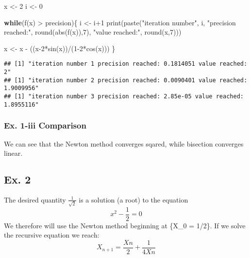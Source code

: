 \documentclass[
]{article}
\newenvironment{Shaded}{\begin{snugshade}}{\end{snugshade}}
\newcommand{\ControlFlowTok}[1]{\textcolor[rgb]{0.13,0.29,0.53}{\textbf{#1}}}
\newcommand{\DecValTok}[1]{\textcolor[rgb]{0.00,0.00,0.81}{#1}}
\newcommand{\FunctionTok}[1]{\textcolor[rgb]{0.00,0.00,0.00}{#1}}
\newcommand{\NormalTok}[1]{#1}
\newcommand{\OtherTok}[1]{\textcolor[rgb]{0.56,0.35,0.01}{#1}}
\newcommand{\SpecialCharTok}[1]{\textcolor[rgb]{0.00,0.00,0.00}{#1}}
\newcommand{\StringTok}[1]{\textcolor[rgb]{0.31,0.60,0.02}{#1}}
\begin{document}
\begin{Shaded}
\begin{Highlighting}[]
\NormalTok{x }\OtherTok{\textless{}{-}} \DecValTok{2}
\NormalTok{i }\OtherTok{\textless{}{-}} \DecValTok{0}

\ControlFlowTok{while}\NormalTok{(}\FunctionTok{f}\NormalTok{(x) }\SpecialCharTok{\textgreater{}}\NormalTok{ precision)\{}
\NormalTok{  i }\OtherTok{\textless{}{-}}\NormalTok{ i}\SpecialCharTok{+}\DecValTok{1}
  \FunctionTok{print}\NormalTok{(}\FunctionTok{paste}\NormalTok{(}\StringTok{"iteration number"}\NormalTok{, i, }\StringTok{"precision reached:"}\NormalTok{, }\FunctionTok{round}\NormalTok{(}\FunctionTok{abs}\NormalTok{(}\FunctionTok{f}\NormalTok{(x)),}\DecValTok{7}\NormalTok{), }\StringTok{"value reached:"}\NormalTok{, }\FunctionTok{round}\NormalTok{(x,}\DecValTok{7}\NormalTok{)))}


\NormalTok{  x }\OtherTok{\textless{}{-}}\NormalTok{ x }\SpecialCharTok{{-}}\NormalTok{ ((x}\DecValTok{{-}2}\SpecialCharTok{*}\FunctionTok{sin}\NormalTok{(x))}\SpecialCharTok{/}\NormalTok{(}\DecValTok{1{-}2}\SpecialCharTok{*}\FunctionTok{cos}\NormalTok{(x)))}
\NormalTok{\}}
\end{Highlighting}
\end{Shaded}

\begin{verbatim}
## [1] "iteration number 1 precision reached: 0.1814051 value reached: 2"
## [1] "iteration number 2 precision reached: 0.0090401 value reached: 1.9009956"
## [1] "iteration number 3 precision reached: 2.85e-05 value reached: 1.8955116"
\end{verbatim}

\hypertarget{ex.-1-iii-comparison}{%
\subsubsection{Ex. 1-iii Comparison}\label{ex.-1-iii-comparison}}

We can see that the Newton method converges sqared, while bisection
converges linear.

\hypertarget{ex.-2}{%
\subsection{Ex. 2}\label{ex.-2}}

The desired quantity \(\frac{1}{\sqrt2}\) is a solution (a root) to the
equation \[
    x^2 - \frac{1}{2} = 0
\] We therefore will use the Newton method beginning at \{X\_0 = 1/2\}.
If we solve the recursive equation we reach: \[
X_{n+1} = \frac{Xn}{2} + \frac{1}{4Xn}
\]
\end{document}
